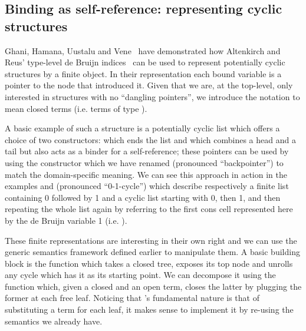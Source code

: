 \subsection{Binding as self-reference: representing cyclic structures}\label{def:colist}

Ghani, Hamana, Uustalu and Vene~\citeyear{ghani2006representing} have
demonstrated how Altenkirch and Reus' type-level de Bruijn
indices~\citeyear{altenkirch1999monadic} can be used to represent
potentially cyclic structures by a finite object. In their
representation each bound variable is a pointer to the node
that introduced it. Given that we are, at the top-level, only
interested in structures with no ``dangling pointers'', we introduce
the notation   to mean closed terms (i.e. terms of type
   \AIC{[]}).

A basic example of such a structure is a potentially cyclic list which
offers a choice of two constructors: \AIC{[]} which ends the list and
\AIC{\_::\_} which combines a head and a tail but also acts as a binder
for a self-reference; these pointers can be used by using the 
constructor which we have renamed  (pronounced ``backpointer'')
to match the domain-specific meaning.
We can see this approach in action in the examples
\AF{[0, 1]} and  (pronounced ``0-1-cycle'') which describe
respectively a finite list containing
0 followed by 1 and a cyclic list starting with 0, then 1, and then
repeating the whole list again by referring to the first cons cell
represented here by the de Bruijn variable 1 (i.e.  ).

\noindent
\begin{minipage}{\textwidth}
  \begin{minipage}{0.55\textwidth}
  \end{minipage}
  \begin{minipage}{0.35\textwidth}
  \end{minipage}
\end{minipage}

These finite representations are interesting in their own right
and we can use the generic semantics framework defined earlier
to manipulate them. A basic building block is the 
function which takes a closed tree, exposes its top node and
unrolls any cycle which has it as its starting point. We can
decompose it using the  function which, given a closed
and an open term, closes the latter by plugging the former at
each free  leaf. Noticing that 's fundamental nature
is that of substituting a term for each leaf, it makes sense to
implement it by re-using the  semantics we already have.

